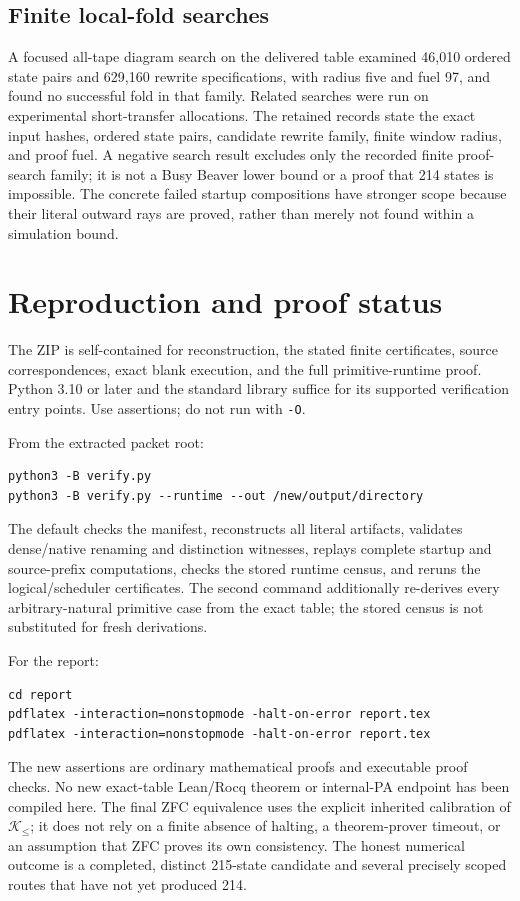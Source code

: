 \documentclass[11pt]{article}
\newcommand{\Kdom}{\mathcal K_{\le}}
\begin{document}
\subsection{Finite local-fold searches}

A focused all-tape diagram search on the delivered table examined 46,010 ordered state pairs and 629,160 rewrite specifications, with radius five and fuel 97, and found no successful fold in that family. Related searches were run on experimental short-transfer allocations. The retained records state the exact input hashes, ordered state pairs, candidate rewrite family, finite window radius, and proof fuel. A negative search result excludes only the recorded finite proof-search family; it is not a Busy Beaver lower bound or a proof that 214 states is impossible. The concrete failed startup compositions have stronger scope because their literal outward rays are proved, rather than merely not found within a simulation bound.

\section{Reproduction and proof status}

The ZIP is self-contained for reconstruction, the stated finite certificates, source correspondences, exact blank execution, and the full primitive-runtime proof. Python 3.10 or later and the standard library suffice for its supported verification entry points. Use assertions; do not run with \texttt{-O}.

From the extracted packet root:
\begin{verbatim}
python3 -B verify.py
python3 -B verify.py --runtime --out /new/output/directory
\end{verbatim}
The default checks the manifest, reconstructs all literal artifacts, validates dense/native renaming and distinction witnesses, replays complete startup and source-prefix computations, checks the stored runtime census, and reruns the logical/scheduler certificates. The second command additionally re-derives every arbitrary-natural primitive case from the exact table; the stored census is not substituted for fresh derivations.

For the report:
\begin{verbatim}
cd report
pdflatex -interaction=nonstopmode -halt-on-error report.tex
pdflatex -interaction=nonstopmode -halt-on-error report.tex
\end{verbatim}

The new assertions are ordinary mathematical proofs and executable proof checks. No new exact-table Lean/Rocq theorem or internal-PA endpoint has been compiled here. The final ZFC equivalence uses the explicit inherited calibration of $\Kdom$; it does not rely on a finite absence of halting, a theorem-prover timeout, or an assumption that ZFC proves its own consistency. The honest numerical outcome is a completed, distinct 215-state candidate and several precisely scoped routes that have not yet produced 214.
\end{document}
